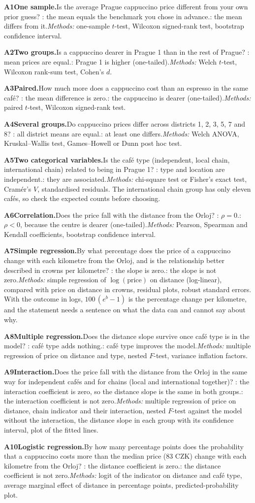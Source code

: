 \documentclass[11pt,a4paper]{article}
\newcommand{\analysis}[6]{%
  \par\smallskip\noindent\textbf{A#1\enspace #2.}\enspace #3\enspace
  \Ho: #4\enspace \Hone: #5\enspace \textit{Methods:} #6\par}
\begin{document}
\analysis{1}{One sample}{Is the average Prague cappuccino price different from your own prior guess?}{the mean equals the benchmark you chose in advance.}{the mean differs from it.}{one-sample $t$-test, Wilcoxon signed-rank test, bootstrap confidence interval.}
\analysis{2}{Two groups}{Is a cappuccino dearer in Prague 1 than in the rest of Prague?}{mean prices are equal.}{Prague 1 is higher (one-tailed).}{Welch $t$-test, Wilcoxon rank-sum test, Cohen's $d$.}
\analysis{3}{Paired}{How much more does a cappuccino cost than an espresso in the same caf\'e?}{the mean difference is zero.}{the cappuccino is dearer (one-tailed).}{paired $t$-test, Wilcoxon signed-rank test.}
\analysis{4}{Several groups}{Do cappuccino prices differ across districts 1, 2, 3, 5, 7 and 8?}{all district means are equal.}{at least one differs.}{Welch ANOVA, Kruskal--Wallis test, Games--Howell or Dunn post hoc test.}
\analysis{5}{Two categorical variables}{Is the caf\'e type (independent, local chain, international chain) related to being in Prague 1?}{type and location are independent.}{they are associated.}{chi-square test or Fisher's exact test, Cram\'er's $V$, standardised residuals. The international chain group has only eleven caf\'es, so check the expected counts before choosing.}
\analysis{6}{Correlation}{Does the price fall with the distance from the Orloj?}{$\rho=0$.}{$\rho<0$, because the centre is dearer (one-tailed).}{Pearson, Spearman and Kendall coefficients, bootstrap confidence interval.}
\analysis{7}{Simple regression}{By what percentage does the price of a cappuccino change with each kilometre from the Orloj, and is the relationship better described in crowns per kilometre?}{the slope is zero.}{the slope is not zero.}{simple regression of $\log(\text{price})$ on distance (log-linear), compared with price on distance in crowns, residual plots, robust standard errors. With the outcome in logs, $100\,(e^{b}-1)$ is the percentage change per kilometre, and the statement needs a sentence on what the data can and cannot say about why.}
\analysis{8}{Multiple regression}{Does the distance slope survive once caf\'e type is in the model?}{caf\'e type adds nothing.}{caf\'e type improves the model.}{multiple regression of price on distance and type, nested $F$-test, variance inflation factors.}
\analysis{9}{Interaction}{Does the price fall with the distance from the Orloj in the same way for independent caf\'es and for chains (local and international together)?}{the interaction coefficient is zero, so the distance slope is the same in both groups.}{the interaction coefficient is not zero.}{multiple regression of price on distance, chain indicator and their interaction, nested $F$-test against the model without the interaction, the distance slope in each group with its confidence interval, plot of the fitted lines.}
\analysis{10}{Logistic regression}{By how many percentage points does the probability that a cappuccino costs more than the median price (83 CZK) change with each kilometre from the Orloj?}{the distance coefficient is zero.}{the distance coefficient is not zero.}{logit of the indicator on distance and caf\'e type, average marginal effect of distance in percentage points, predicted-probability plot.}
\end{document}
